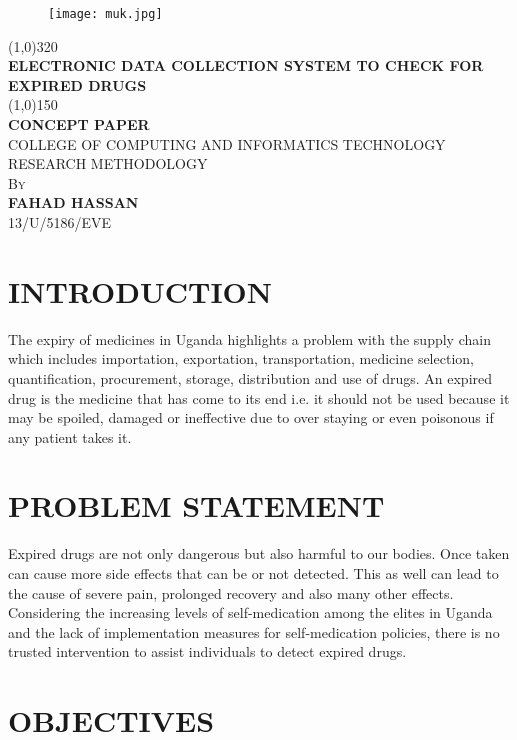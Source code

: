 \documentclass{article}
\begin{document}
\begin{titlepage}
	\begin{figure}
		\centering
		\texttt{[image: muk.jpg]}
	\end{figure}
	\begin{center}
		\line(1,0){320}\\
		[0.25in]
		\huge{\bfseries ELECTRONIC DATA COLLECTION SYSTEM TO CHECK FOR EXPIRED DRUGS}\\
		[2mm]
		\line(1,0){150}\\
		[1cm]
		\huge{\bfseries CONCEPT PAPER}\\
		[2mm]
		\textsc{\large COLLEGE OF COMPUTING AND INFORMATICS TECHNOLOGY}\\
		[0.5cm]
		\textsc{\large RESEARCH METHODOLOGY}\\
		[0.5cm]
		\textsc{\large By}\\
		[0.5cm]
		\huge{\bfseries FAHAD HASSAN}\\
		[2mm]
		\textsc{\large 13/U/5186/EVE}\\
		[0.5cm]
	\end{center}
	
\end{titlepage}
\thispagestyle{empty}
\section{INTRODUCTION}

The expiry of medicines in Uganda highlights a problem with the supply chain which includes importation, exportation, transportation, medicine selection, quantification, procurement, storage, distribution and use of drugs. An expired drug is the medicine that has come to its end i.e. it should not be used because it may be spoiled, damaged or ineffective due to over staying or even poisonous if any patient takes it.
\section{PROBLEM STATEMENT}
Expired drugs are not only dangerous but also harmful to our bodies. Once taken can cause more side effects that can be or not detected. This as well can lead to the cause of severe pain, prolonged recovery and also many other effects. Considering the increasing levels of self-medication among the elites in Uganda and the lack of implementation measures for self-medication policies, there is no trusted intervention to assist individuals to detect expired drugs.
\section{OBJECTIVES}
\end{document}
